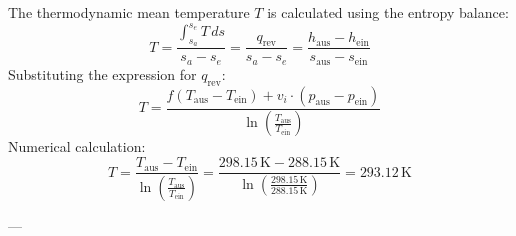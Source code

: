 The thermodynamic mean temperature \( T \) is calculated using the entropy balance:  
\[
T = \frac{\int_{s_a}^{s_e} T \, ds}{s_a - s_e} = \frac{q_{\text{rev}}}{s_a - s_e} = \frac{h_{\text{aus}} - h_{\text{ein}}}{s_{\text{aus}} - s_{\text{ein}}}
\]  
Substituting the expression for \( q_{\text{rev}} \):  
\[
T = \frac{f \left( T_{\text{aus}} - T_{\text{ein}} \right) + v_i \cdot \left( p_{\text{aus}} - p_{\text{ein}} \right)}{\ln \left( \frac{T_{\text{aus}}}{T_{\text{ein}}} \right)}
\]  
Numerical calculation:  
\[
T = \frac{T_{\text{aus}} - T_{\text{ein}}}{\ln \left( \frac{T_{\text{aus}}}{T_{\text{ein}}} \right)} = \frac{298.15 \, \text{K} - 288.15 \, \text{K}}{\ln \left( \frac{298.15 \, \text{K}}{288.15 \, \text{K}} \right)} = 293.12 \, \text{K}
\]  

---